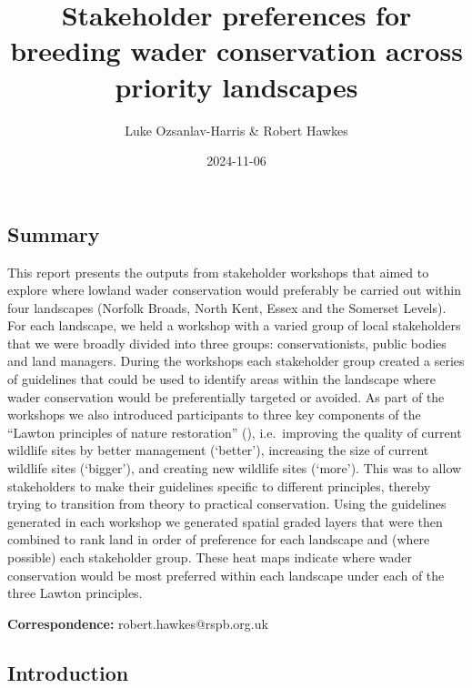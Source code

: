 \documentclass[
  12pt,
  letterpaper,
  DIV=11,
  numbers=noendperiod]{scrartcl}
\title{Stakeholder preferences for breeding wader conservation across
priority landscapes}
\author{Luke Ozsanlav-Harris \& Robert Hawkes}
\date{2024-11-06}
\begin{document}
\maketitle


\subsection{Summary}\label{summary}

This report presents the outputs from stakeholder workshops that aimed
to explore where lowland wader conservation would preferably be carried
out within four landscapes (Norfolk Broads, North Kent, Essex and the
Somerset Levels). For each landscape, we held a workshop with a varied
group of local stakeholders that we were broadly divided into three
groups: conservationists, public bodies and land managers. During the
workshops each stakeholder group created a series of guidelines that
could be used to identify areas within the landscape where wader
conservation would be preferentially targeted or avoided. As part of the
workshops we also introduced participants to three key components of the
``Lawton principles of nature restoration''
(), i.e.~improving the
quality of current wildlife sites by better management (`better'),
increasing the size of current wildlife sites (`bigger'), and creating
new wildlife sites (`more'). This was to allow stakeholders to make
their guidelines specific to different principles, thereby trying to
transition from theory to practical conservation. Using the guidelines
generated in each workshop we generated spatial graded layers that were
then combined to rank land in order of preference for each landscape and
(where possible) each stakeholder group. These heat maps indicate where
wader conservation would be most preferred within each landscape under
each of the three Lawton principles.

\textbf{Correspondence:} robert.hawkes@rspb.org.uk

\newpage{}

\subsection{Introduction}\label{introduction}
\end{document}
